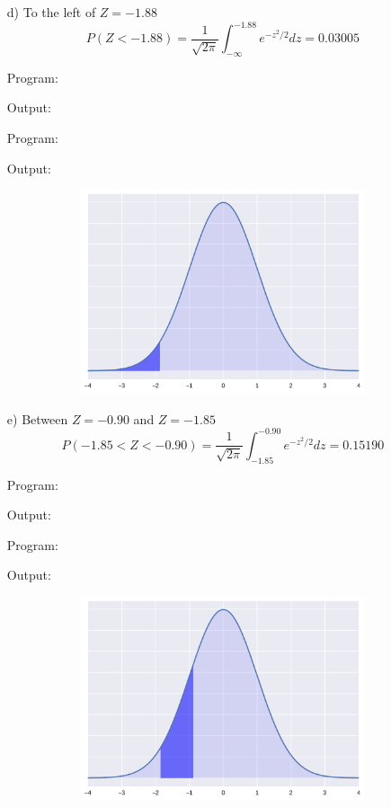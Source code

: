 \documentclass[a4paper,10pt,openright]{report}
\begin{document}
\begin{enumerate}
\begin{enumerate}
\item[d)] To the left of $Z = -1.88$
\begin{equation*}
P(Z < -1.88) = \frac{1}{\sqrt{2\pi}} \int_{-\infty}^{-1.88} e^{-z^{2}/2} dz = 0.03005
\end{equation*}

\vspace{1cm}

Program:

Output:


\vspace{1cm}

Program:

Output:


\begin{figure}[ht!]
\includegraphics[width=12cm,height=6cm,keepaspectratio]{norm1d.pdf}
\centering
\end{figure}

\item[e)] Between $Z = -0.90$ and $Z = -1.85$
\begin{equation*}
P(-1.85 < Z < -0.90) = \frac{1}{\sqrt{2\pi}} \int_{-1.85}^{-0.90} e^{-z^{2}/2} dz = 0.15190 
\end{equation*}

\vspace{0.5cm}

Program:

Output:


\vspace{1cm}

Program:

Output:


\begin{figure}[ht!]
\includegraphics[width=12cm,height=6cm,keepaspectratio]{norm1e.pdf}
\centering
\end{figure}


\end{enumerate}
\end{enumerate}
\end{document}
